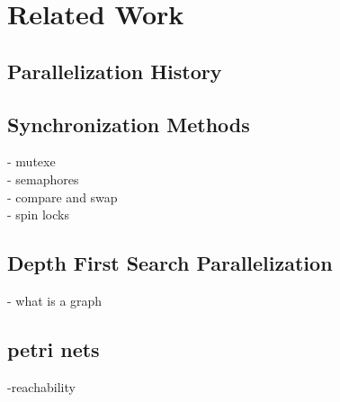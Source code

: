 \chapter{Related Work}

\section{Parallelization History}
\section{Synchronization Methods}
- mutexe\\
- semaphores\\
- compare and swap\\
- spin locks\\
\section{Depth First Search Parallelization}
- what is a graph

\section{petri nets}
-reachability